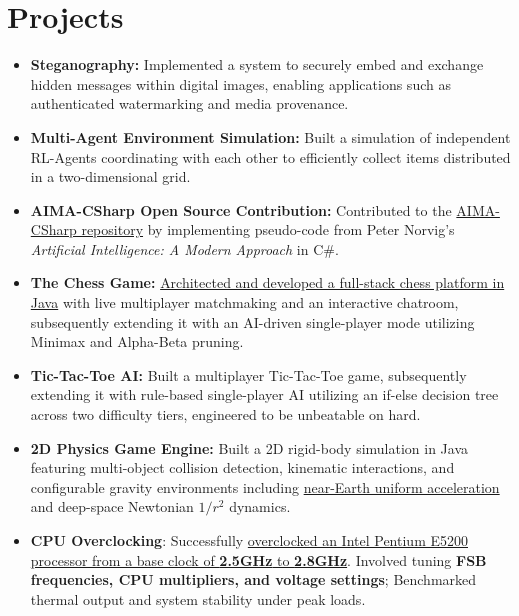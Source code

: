 \documentclass[a4paper,11pt]{article}
\newcommand{\resumeItemListStart}{\begin{itemize}[label=$\circ$,leftmargin=0.15in,itemsep=1.0mm]}
\newcommand{\resumeItemListEnd}{\end{itemize}\vspace{1mm}}
\begin{document}
\section{\Large{\textbf{Projects}}}
\vspace{2mm}
\resumeItemListStart
    \item \textbf{Steganography:} Implemented a system to securely embed and exchange hidden messages within digital images, enabling applications such as authenticated watermarking and media provenance.
    \item \textbf{Multi-Agent Environment Simulation:} Built a simulation of independent RL-Agents coordinating with each other to efficiently collect items distributed in a two-dimensional grid.
    \item \textbf{AIMA-CSharp Open Source Contribution:} Contributed to the \href{https://github.com/aimacode/aima-csharp/commit/0a7003883f33a5781ffcb92e243fa9effee9fbba}{AIMA-CSharp repository} by implementing pseudo-code from Peter Norvig’s \textit{Artificial Intelligence: A Modern Approach} in C\#.
    \item \textbf{The Chess Game:} \href{https://github.com/manu4rhyme-zz/TheChessGame}{Architected and developed a full-stack chess platform in Java} with live multiplayer matchmaking and an interactive chatroom, subsequently extending it with an AI-driven single-player mode utilizing Minimax and Alpha-Beta pruning.
    \item \textbf{Tic-Tac-Toe AI:} Built a multiplayer Tic-Tac-Toe game, subsequently extending it with rule-based single-player AI utilizing an if-else decision tree across two difficulty tiers, engineered to be unbeatable on hard.
    \item \textbf{2D Physics Game Engine:} Built a 2D rigid-body simulation in Java featuring multi-object collision detection, kinematic interactions, and configurable gravity environments including \href{https://www.youtube.com/watch?v=k_0ovq4Qi6c}{near-Earth uniform acceleration} and deep-space Newtonian \(1/r^2\) dynamics.
    \item \textbf{CPU Overclocking}: Successfully \href{https://www.youtube.com/watch?v=HnGi9GVTVXo}{overclocked an Intel Pentium E5200 processor from a base clock of \textbf{2.5GHz} to \textbf{2.8GHz}}. Involved tuning \textbf{FSB frequencies, CPU multipliers, and voltage settings}; Benchmarked thermal output and system stability under peak loads.
\resumeItemListEnd
\end{document}
